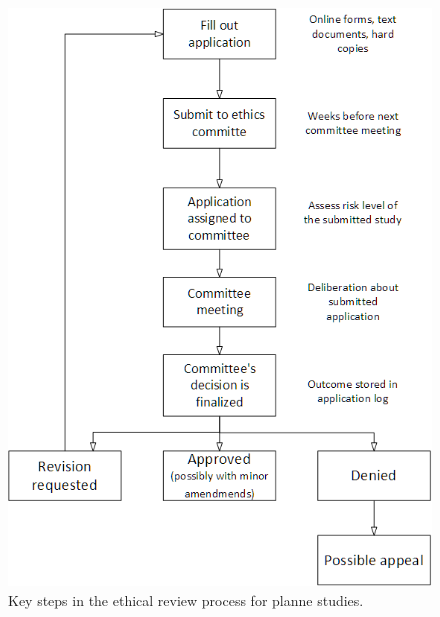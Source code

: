 \documentclass[10pt]{article}
\begin{document}
\begin{figure}
	\includegraphics[width=1\textwidth]{img/process.png}
	\caption{Key steps in the ethical review process for planne studies.}
	\label{flowapplication}
\end{figure}	
\end{document}
